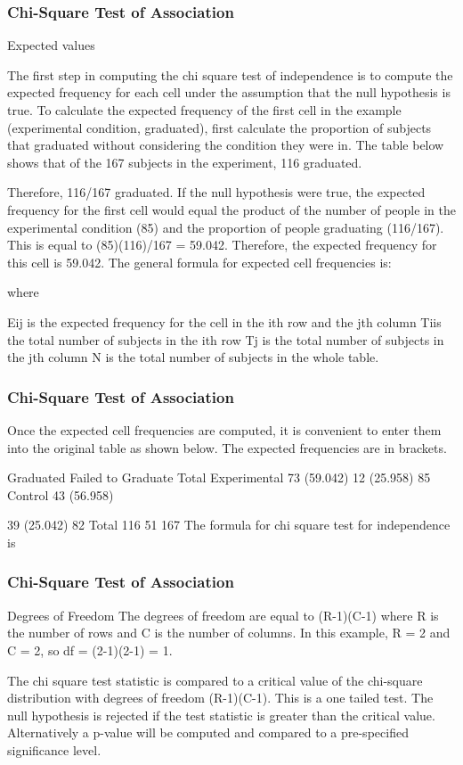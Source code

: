\begin{frame}
\frametitle{Chi-Square Test of Association}

\Large

Expected values
 
The first step in computing the chi square test of independence is to compute the expected frequency for each cell under the assumption that the null hypothesis is true. To calculate the expected frequency of the first cell in the example (experimental condition, graduated), first calculate the proportion of subjects that graduated without considering the condition they were in. The table below shows that of the 167 subjects in the experiment, 116 graduated.
 
Therefore, 116/167 graduated. If the null hypothesis were true, the expected frequency for the first cell would equal the product of the number of people in the experimental condition (85) and the proportion of people graduating (116/167). This is equal to (85)(116)/167 = 59.042. Therefore, the expected frequency for this cell is 59.042. The general formula for expected cell frequencies is:
 
  
where
 
Eij is the expected frequency for the cell in the ith row and the jth column
Tiis the total number of subjects in the ith row
Tj is the total number of subjects in the jth column
N is the total number of subjects in the whole table. 
\end{frame}

\begin{frame}
\frametitle{Chi-Square Test of Association}

\Large
 
Once the expected cell frequencies are computed, it is convenient to enter them into the original table as shown below. The expected frequencies are in brackets. 
 
 
 
Graduated
Failed to
Graduate
Total
Experimental
73
(59.042)
12
(25.958)
85
Control
43
(56.958)
 
39
(25.042)
82
Total
116
51
167
The formula for chi square test for independence is 
 
 \end{frame}

\begin{frame}
\frametitle{Chi-Square Test of Association}

\Large
 
Degrees of Freedom 
The degrees of freedom are equal to (R-1)(C-1) where R is the number of rows and C is the number of columns. In this example, R = 2 and C = 2, so df = (2-1)(2-1) = 1.
 
The chi square test statistic is compared to a critical value of the chi-square distribution with degrees of freedom (R-1)(C-1). This is a one tailed test. The null hypothesis is rejected if the test statistic is greater than the critical value. Alternatively a p-value will be computed and compared to a pre-specified significance level.
 
 \end{frame}

